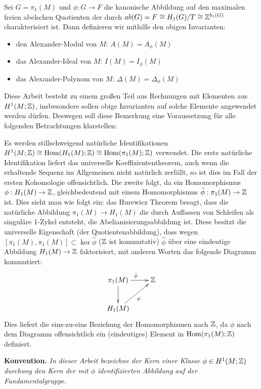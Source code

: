         \begin{defn}
            Sei $G=\pi_1(M)$ und $\phi:G \to F$ die kanonische Abbildung auf den maximalen freien abelschen Quotienten der durch $ab(G) = F \cong H_1(G)/T \cong \mathbb{Z}^{b_1(G)}$ charakterisiert ist. Dann definieren wir mithilfe den obigen Invarianten:
            \begin{itemize}
                \item den Alexander-Modul von $M$: $A(M)=A_\phi(M)$
                \item das Alexander-Ideal von $M$: $I(M)=I_\phi(M)$
                \item das Alexander-Polynom von $M$: $\Delta(M)=\Delta_\phi(M)$ 
            \end{itemize}
        \end{defn}
        \begin{bem}
            \label{bem:fundhomologie}
            Diese Arbeit besteht zu einem großen Teil aus Rechnungen mit Elementen aus $H^1(M;\mathbb{Z})$, insbesondere sollen obige Invarianten auf solche Elemente angewendet werden dürfen. Deswegen soll diese Bemerkung eine Voraussetzung für alle folgenden Betrachtungen klarstellen:

            Es werden stillschweigend natürliche Identifikationen $H^1(M;\mathbb{Z}) \cong \operatorname{Hom}(H_1(M);\mathbb{Z}) \cong \operatorname{Hom}(\pi_1(M);\mathbb{Z})$ verwendet. Die erste natürliche Identifikation liefert das universelle Koeffiziententheorem, auch wenn die erhaltende Sequenz im Allgemeinen nicht natürlich zerfällt, so ist dies im Fall der ersten Kohomologie offensichtlich. Die zweite folgt, da ein Homomorphismus $\phi: H_1(M) \to \mathbb{Z}$, gleichbedeutend mit einem Homomorphismus $\hat\phi : \pi_1(M) \to \mathbb{Z}$ ist. Dies sieht man wie folgt ein: das Hurewicz Theorem besagt, dass die natürliche Abbildung $\pi_1(M) \to H_1(M)$ die durch Auffassen von Schleifen als singuläre 1-Zykel entsteht, die Abelianisierungsabbildung ist. Diese besitzt die universelle Eigenschaft (der Quotientenabbildung), dass wegen $[\pi_1(M),\pi_1(M)] \subset \ker \hat \phi$ ($\mathbb{Z}$ ist kommutativ) $\hat \phi$ über eine eindeutige Abbildung $H_1(M) \to \mathbb{Z}$ faktorisiert, mit anderen Worten das folgende Diagramm kommutiert:
            \[
                \begin{xy}
                    \xymatrix{\pi_1(M)\ar[r]^{\hat \phi} \ar[d] & \ZZ \\
                                H_1(M)\ar[ru]_\phi}
                \end{xy}
            \]
            Dies liefert die eins-zu-eins Beziehung der Homomorphismen nach $\mathbb{Z}$, da $\phi$ nach dem Diagramm offensichtlich ein (eindeutiges) Element in $\operatorname{Hom}(\pi_1(M);\mathbb{Z})$ definiert. \\ \par
            \noindent\textbf{Konvention.} \emph{In dieser Arbeit bezeichne der Kern einer Klasse $\phi \in H^1(M;\mathbb{Z})$ durchweg den Kern der mit $\phi$ identifizierten Abbildung auf der Fundamentalgruppe.}\\ \par
        \end{bem}

